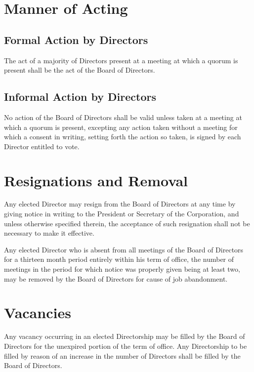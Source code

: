 \section{Manner of Acting}

\subsection{Formal Action by Directors}

The act of a majority of Directors present at a meeting at which a quorum is
present shall be the act of the Board of Directors.

\subsection{Informal Action by Directors}

No action of the Board of Directors shall be valid unless taken at a meeting at
which a quorum is present, excepting any action taken without a meeting for
which a consent in writing, setting forth the action so taken, is signed by each
Director entitled to vote.

\section{Resignations and Removal}

Any elected Director may resign from the Board of Directors at any time by
giving notice in writing to the President or Secretary of the Corporation, and
unless otherwise specified therein, the acceptance of such resignation shall not
be necessary to make it effective.

Any elected Director who is absent from all meetings of the Board of Directors
for a thirteen month period entirely within his term of office, the number of
meetings in the period for which notice was properly given being at least two,
may be removed by the Board of Directors for cause of job abandonment.

\section{Vacancies}

Any vacancy occurring in an elected Directorship may be filled by the Board of
Directors for the unexpired portion of the term of office.  Any Directorship to
be filled by reason of an increase in the number of Directors shall be filled by
the Board of Directors.

